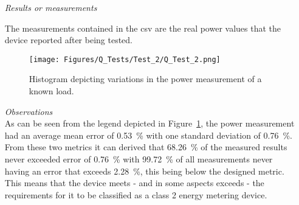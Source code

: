 \begin{itemize}
    \begin{itemize}
        \item [Step 1:] The \qty{1.8}{\kW} heater is turned on and left running for 1 minute.
        \item [Step 2:] The test is started and the results are recorded as soon as the website that is hosted by the Dash application is accessed via the local IP~Address presented in the terminal.
        \item [Step 3:] The following checks are performed every 5 min to ensure that the results from the test are valid.
        \begin{itemize}
            \item The current waveform as it displays on the GUI is verified with the waveform displayed on the Oscilloscope.
            \item The voltage and current measurements are confirmed using the multimeter. 
        \end{itemize}
        \item[Step 4:] Once the test is completed the csv is transferred into python.
        \item[Step 5:] A histogram that depicts the measured real power from the test is generated.
        \item[Step 6:] The measured power fluctuations are converted to an error percentage.
        \item[Step 7:] The results are depicted in a figure for simple analysis.
    \end{itemize}
    \item [\emph{Results or measurements}]\mbox{}
    
    The measurements contained in the csv are the real power values that the device reported after being tested.  
    \begin{figure}[H]
        \centering
        \texttt{[image: Figures/Q\_Tests/Test\_2/Q\_Test\_2.png]}
        \caption{Histogram depicting variations in the power measurement of a known load.}
        \label{fig:Qtest_2}
    \end{figure}
    \item [\emph{Observations}]\mbox{}\\
    As can be seen from the legend depicted in Figure~\ref{fig:Qtest_2}, the power measurement had an average mean error of \qty{0.53}{\percent} with one standard deviation of \qty{0.76}{\percent}. From these two metrics it can derived that \qty{68.26}{\percent} of the measured results never exceeded error of \qty{0.76}{\percent} with \qty{99.72}{\percent} of all measurements never having an error that exceeds \qty{2.28}{\percent}, this being below the designed metric. This means that the device meets - and in some aspects exceeds - the requirements for it to be classified as a class 2 energy metering device. 
\end{itemize}
